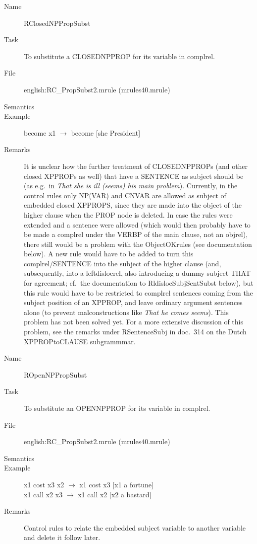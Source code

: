 \begin{description}
\vspace{1 cm}
\begin{description}
\item[Name]  RClosedNPPropSubst
\item[Task] To substitute a CLOSEDNPPROP for its variable in complrel. 
\item[File] english:RC\_PropSubst2.mrule (mrules40.mrule)
\item[Semantics]
\item[Example] become x1 $\rightarrow$ become [she President]
\item[Remarks] It is unclear how the further treatment of CLOSEDNPPROPs (and 
other closed XPPROPs as well) that have a SENTENCE as subject should be (as 
e.g.\ in {\em That she is ill (seems) his main problem\/}). Currently, in 
the control rules only NP(VAR) and CNVAR are allowed as subject of embedded 
closed XPPROPS, since they are made into the object of the higher clause when 
the PROP node is deleted. In case the rules 
were extended and a sentence were allowed (which would then probably have to be 
made a complrel under the VERBP of the main clause, not an objrel), 
there still would be a 
problem with the ObjectOKrules (see documentation below). A new rule would have 
to be added to turn this complrel/SENTENCE into the subject of the higher 
clause (and, subsequently, 
into a leftdislocrel, also introducing a dummy subject THAT for agreement; cf.\ 
the documentation to RldislocSubjSentSubst below), but this rule would have to 
be restricted to complrel sentences coming from the subject position of an 
XPPROP, and leave ordinary argument sentences alone (to prevent 
malconstructions like {\em That he comes seems\/}). This problem has not been 
solved yet. For a more extensive discussion of this problem, see the remarks 
under RSentenceSubj in doc.\ 314 on the Dutch XPPROPtoCLAUSE subgrammmar.
\end{description}

\vspace{1 cm}
\begin{description}
\item[Name]  ROpenNPPropSubst
\item[Task] To substitute an OPENNPPROP for its variable in 
complrel. 
\item[File] english:RC\_PropSubst2.mrule (mrules40.mrule)
\item[Semantics]
\item[Example] x1 cost x3 x2 $\rightarrow$ x1 cost x3 [x1 a fortune]\\
x1 call x2 x3 $\rightarrow$ x1 call x2 [x2 a bastard]
\item[Remarks] Control rules to relate the embedded subject variable to 
another variable and delete it follow later.
\end{description}


\end{description}
